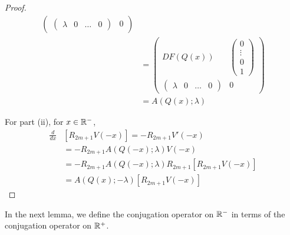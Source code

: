 \documentclass[thesis.tex]{subfiles}
\begin{document}
\begin{lemma}
\begin{proof}
\begin{align*}
\begin{pmatrix}
\begin{pmatrix} \lambda & 0 & \dots & 0 \end{pmatrix} & 0
\end{pmatrix} \\
&= \begin{pmatrix}
DF(Q(x)) & \begin{pmatrix} 0 \\ \vdots \\ 0 \\ 1 \end{pmatrix} \\
\begin{pmatrix} \lambda & 0 & \dots & 0 \end{pmatrix} & 0
\end{pmatrix} \\ 
&= A(Q(x); \lambda)
\end{align*}

For part (ii), for $x \in \mathbb{R}^-$,
\begin{align*}
\frac{d}{dx} &\left[ R_{2m+1} V(-x) \right] = -R_{2m+1} V'(-x) \\
&= -R_{2m+1} A(Q(-x); \lambda) V(-x) \\
&= -R_{2m+1} A(Q(-x); \lambda) R_{2m+1} [ R_{2m+1} V(-x)] \\
&= A(Q(x); -\lambda) [R_{2m+1} V(-x)]
\end{align*}
\end{proof}
\end{lemma}

In the next lemma, we define the conjugation operator on $\mathbb{R}^-$ in terms of the conjugation operator on $\mathbb{R}^+$.
\end{document}
